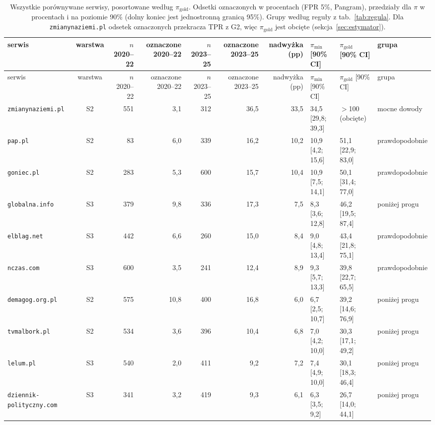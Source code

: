 \begin{landscape}
\footnotesize
\setlength{\tabcolsep}{4pt}
\begin{longtable}{@{}l c r r r r r l l l@{}}
\caption{Wszystkie porównywane serwisy, posortowane według $\pi_{\mathrm{gold}}$. Odsetki oznaczonych w procentach (FPR 5\%, Pangram), przedziały dla $\pi$ w procentach i na poziomie 90\% (dolny koniec jest jednostronną granicą 95\%). Grupy według reguły z tab.~\ref{tab:regula}. Dla \texttt{zmianynaziemi.pl} odsetek oznaczonych przekracza TPR z G2, więc $\pi_{\mathrm{gold}}$ jest obcięte (sekcja~\ref{sec:estymator}).}\label{tab:serwisy}\\
\toprule
serwis & warstwa & $n$ 2020--22 & oznaczone 2020--22 & $n$ 2023--25 & oznaczone 2023--25 & nadwyżka (pp) & $\pi_{\mathrm{min}}$ [90\% CI] & $\pi_{\mathrm{gold}}$ [90\% CI] & grupa \\
\midrule
\endfirsthead
\toprule
serwis & warstwa & $n$ 2020--22 & oznaczone 2020--22 & $n$ 2023--25 & oznaczone 2023--25 & nadwyżka (pp) & $\pi_{\mathrm{min}}$ [90\% CI] & $\pi_{\mathrm{gold}}$ [90\% CI] & grupa \\
\midrule
\endhead
\bottomrule
\endlastfoot
\texttt{zmianynaziemi.pl} & S2 & 551 & 3,1 & 312 & 36,5 & 33,5 & 34,5 [29,8; 39,3] & $>$100 (obcięte) & mocne dowody \\
\texttt{pap.pl} & S2 & 83 & 6,0 & 339 & 16,2 & 10,2 & 10,9 [4,2; 15,6] & 51,1 [22,9; 83,0] & prawdopodobnie \\
\texttt{goniec.pl} & S2 & 283 & 5,3 & 600 & 15,7 & 10,4 & 10,9 [7,5; 14,1] & 50,1 [31,4; 77,0] & prawdopodobnie \\
\texttt{globalna.info} & S3 & 379 & 9,8 & 336 & 17,3 & 7,5 & 8,3 [3,6; 12,8] & 46,2 [19,5; 87,4] & poniżej progu \\
\texttt{elblag.net} & S3 & 442 & 6,6 & 260 & 15,0 & 8,4 & 9,0 [4,8; 13,4] & 43,4 [21,8; 75,1] & prawdopodobnie \\
\texttt{nczas.com} & S3 & 600 & 3,5 & 241 & 12,4 & 8,9 & 9,3 [5,7; 13,3] & 39,8 [22,7; 65,5] & prawdopodobnie \\
\texttt{demagog.org.pl} & S2 & 575 & 10,8 & 400 & 16,8 & 6,0 & 6,7 [2,5; 10,7] & 39,2 [14,6; 76,9] & poniżej progu \\
\texttt{tvmalbork.pl} & S2 & 534 & 3,6 & 396 & 10,4 & 6,8 & 7,0 [4,2; 10,0] & 30,3 [17,1; 49,2] & poniżej progu \\
\texttt{lelum.pl} & S3 & 540 & 2,0 & 411 & 9,2 & 7,2 & 7,4 [4,9; 10,0] & 30,1 [18,3; 46,4] & poniżej progu \\
\texttt{dziennik-polityczny.com} & S3 & 341 & 3,2 & 419 & 9,3 & 6,1 & 6,3 [3,5; 9,2] & 26,7 [14,0; 44,1] & poniżej progu \\

\end{longtable}
\end{landscape}
